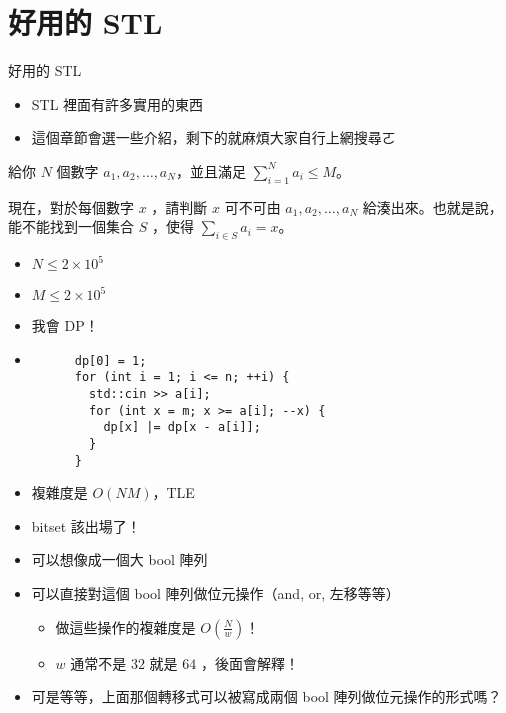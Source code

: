 \documentclass[standalone]{beamer}
\begin{document}
\section{好用的 STL}

\begin{frame}{好用的 STL}
  \begin{itemize}
    \item STL 裡面有許多實用的東西
    \item 這個章節會選一些介紹，剩下的就麻煩大家自行上網搜尋ㄛ
  \end{itemize}
\end{frame}

\begin{frame}{}
  \begin{problem}
    給你 $N$ 個數字 $a_1, a_2, \dots, a_N$，並且滿足 $\sum_{i = 1}^{N} a_i \le M$。

    現在，對於每個數字 $x$ ，請判斷 $x$ 可不可由 $a_1, a_2, \dots, a_N$ 給湊出來。也就是說，能不能找到一個集合 $S$ ，使得 $\sum_{i \in S} a_i = x$。

    \begin{itemize}
        \item $N \leq 2 \times 10^5$
        \item $M \leq 2 \times 10^5$
    \end{itemize}
  \end{problem}
\end{frame}

\begin{frame}[fragile]{}
  \begin{itemize}
    \item 我會 DP！
    \item
    \begin{verbatim}
      dp[0] = 1;
      for (int i = 1; i <= n; ++i) {
        std::cin >> a[i];
        for (int x = m; x >= a[i]; --x) {
          dp[x] |= dp[x - a[i]];
        }
      }
    \end{verbatim}
    \item 複雜度是 $O(NM)$，TLE
    \item bitset 該出場了！ 
  \end{itemize}
\end{frame}

\begin{frame}{}
  \begin{itemize}
    \item 可以想像成一個大 bool 陣列
    \item 可以直接對這個 bool 陣列做位元操作（and, or, 左移等等）
    \begin{itemize}
      \item 做這些操作的複雜度是 $O(\frac{N}{w})$！
      \item $w$ 通常不是 $32$ 就是 $64$ ，後面會解釋！
    \end{itemize}
    \item 可是等等，上面那個轉移式可以被寫成兩個 bool 陣列做位元操作的形式嗎？
  \end{itemize}
\end{frame}
\end{document}
